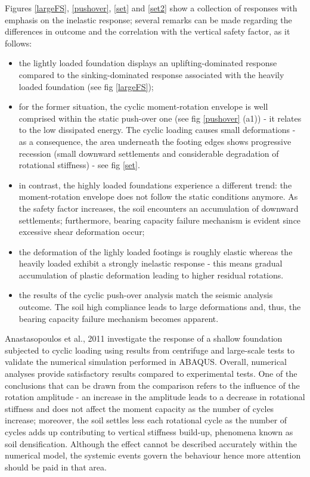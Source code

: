 \documentclass[12pt,a4paper]{report}
\begin{document}
\newpage
Figures \ref{largeFS}, \ref{pushover}, \ref{set} and \ref{set2} show a collection of responses with emphasis on the inelastic response; several remarks can be made regarding the differences in outcome and the correlation with the vertical safety factor, as it follows:

\begin{itemize}
	\item the lightly loaded foundation displays an uplifting-dominated response compared to the sinking-dominated response associated with the heavily loaded foundation (see fig \ref{largeFS});
	\item for the former situation, the cyclic moment-rotation envelope is well comprised within the static push-over one (see fig \ref{pushover} (a1)) - it relates to the low dissipated energy. The cyclic loading causes small deformations - as a consequence, the area underneath the footing edges shows progressive recession (small downward settlements and considerable degradation of rotational stiffness) - see fig \ref{set}. 
	\item in contrast, the highly loaded foundations experience a different trend: the moment-rotation envelope does not follow the static conditions anymore. As the safety factor increases, the soil encounters an accumulation of downward settlements; furthermore, bearing capacity failure mechanism is evident since excessive shear deformation occur;
	\item the deformation of the lighly loaded footings is roughly elastic whereas the heavily loaded exhibit a strongly inelastic response - this means gradual accumulation of plastic deformation leading to higher residual rotations.
	\item the results of the cyclic push-over analysis match the seismic analysis outcome. The soil high compliance leads to large deformations and, thus, the bearing capacity failure mechanism becomes apparent.
\end{itemize}

Anastasopoulos et al., 2011 \cite{anastasopoulos2011simplified} investigate the response of a shallow foundation subjected to cyclic loading using results from centrifuge and large-scale tests to validate the numerical simulation performed in ABAQUS. 
Overall, numerical analyses provide satisfactory results compared to experimental tests. One of the conclusions that can be drawn from the comparison refers to the influence of the rotation amplitude - an increase in the amplitude leads to a decrease in rotational stiffness and does not affect the moment capacity as the number of cycles increase; moreover, the soil settles less each rotational cycle as the number of cycles adds up contributing to vertical stiffness build-up, phenomena known as soil densification. Although the effect cannot be described accurately within the numerical model, the systemic events govern the behaviour hence more attention should be paid in that area.
\end{document}
